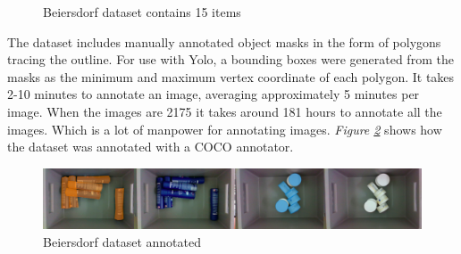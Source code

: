 \begin{figure}[h]
    \hfill
    \hfill
    \hfill
    \hfill
    \hfill
    \hfill
    \caption{Beiersdorf dataset contains 15 items\cite{bjarnason_1984-_detecting_2021}}
    \label{fig:beiersdorf}
\end{figure}
The dataset includes manually annotated object masks in the form of polygons tracing the outline.  For use with Yolo, a bounding boxes were generated from the masks as the minimum and maximum vertex coordinate of each polygon.
It takes 2-10 minutes to annotate an image, averaging approximately 5 minutes per image. When the images are 2175 it takes around 181 hours to annotate all the images. Which is a lot of manpower for annotating images. \textit{Figure \ref{fig:beiersdorfanno}} shows how the dataset was annotated with a COCO annotator\cite{brooks_jsbrokscoco-annotator_2021}.
\begin{figure}[h]
    \centering
    \includegraphics[width=1\textwidth,  angle =0]{graphics/methods/sverrirannotated.PNG}
    \caption{Beiersdorf dataset annotated\cite{bjarnason_1984-_detecting_2021}}
    \label{fig:beiersdorfanno}
\end{figure}


